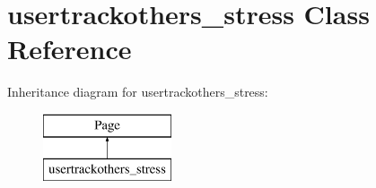 \hypertarget{classusertrackothers__stress}{\section{usertrackothers\-\_\-stress Class Reference}
\label{classusertrackothers__stress}
}
Inheritance diagram for usertrackothers\-\_\-stress\-:\begin{figure}[H]
\begin{center}
\leavevmode
\includegraphics[height=2.000000cm]{classusertrackothers__stress}
\end{center}
\end{figure}
